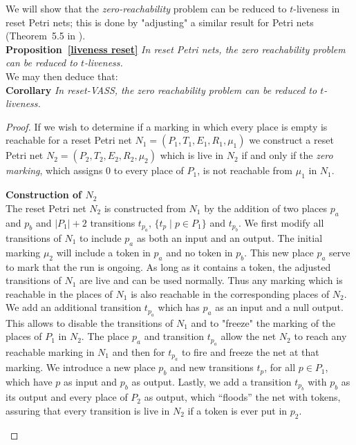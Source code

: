 \documentclass[runningheads]{llncs}
\begin{document}
We will show that the {\em zero-reachability} problem can be reduced to {\sc $t$-liveness} in reset Petri nets; this is done by "adjusting" a similar result for Petri nets (Theorem~5.5 in  \cite{peterson1981petri}).\\



\noindent
\textbf{Proposition~\ref{liveness reset}}
{\em In reset Petri nets, the zero reachability problem can be reduced to {\sc $t$-liveness}.}\\

We may then deduce that:\\

\noindent
\textbf{Corollary}
{\em In reset-VASS, the zero reachability problem can be reduced to {\sc $t$-liveness}.}


\begin{proof}


If we wish to determine if a marking in which every place is empty is reachable for a reset Petri net
 $N_1 = (P_1, T_1, E_1, R_1, \mu_1)$ 
 we construct a reset Petri net
 $N_2 = (P_2, T_2, E_2, R_2, \mu_2)$ 
  which is live in $N_2$ if and only if the {\em zero marking}, which assigns $0$ to every place of $P_1$, is not reachable from $\mu_1$ in $N_1$. \\

\begin{samepage}
{\bf Construction of $N_2$} \\
\indent
The reset Petri net $N_2$ is constructed from $N_1$ by the addition of two places $p_a$ and $p_b$ and $|P_1| +2$ transitions $t_{p_a}$, $\{ t_p \mid p \in P_1 \}$ and $t_{p_b}$.
We first modify all transitions of $N_1$ to include $p_a$ as both an input and an output.
The initial marking $\mu_2$ will include a token in $p_a$ and no token in $p_b$. 
This new place $p_a$ serve to mark that the run is ongoing. As long as it contains a token, the adjusted transitions of $N_1$ are live and can be used normally. Thus any marking which is reachable in the places of $N_1$ is also reachable in the corresponding places of $N_2$.
We add an additional transition $t_{p_a}$ 
which has $p_a$ as an input and a null output.
This allows to disable the transitions of $N_1$ and to "freeze" the marking of the places of $P_1$ in $N_2$.
 The place $p_a$ and transition $t_{p_a}$ allow the net $N_2$ to reach any reachable marking in $N_1$ and then for $t_{p_a}$ to fire and freeze the net at that marking.
We introduce a new place $p_b$ and new transitions $t_p$, for all $p \in P_1$, which have $p$ as input and $p_b$ as output.
Lastly, we add a transition $t_{p_b}$ with $p_b$ as its output and every place of $P_2$ as output, which ``floods'' the net with tokens, assuring that every transition is live in $N_2$ if a token is ever
put in $p_2$.
\end{samepage}


\end{proof}
\end{document}
